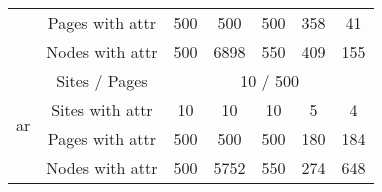 \begin{tabular}{|c|c|ccccc|}
& Pages with attr
& 500 & 500 & 500 & 358 & 41 \\

& Nodes with attr
& 500 & 6898 & 550 & 409 & 155 \\

\cline{1-7}
\multirow{4}{*}{ar}
& Sites / Pages
& \multicolumn{5}{c|}{10 / 500} \\
\cline{2-7}
& Sites with attr
& 10 & 10 & 10 & 5 & 4 \\

& Pages with attr
& 500 & 500 & 500 & 180 & 184 \\

& Nodes with attr
& 500 & 5752 & 550 & 274 & 648 \\

\hline
\end{tabular}
